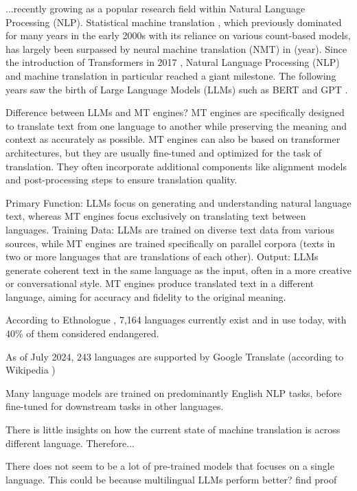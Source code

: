 \documentclass[a4paper]{article}
\begin{document}
...recently growing as a popular research field within Natural Language Processing (NLP). Statistical machine translation \cite{lopez-2008-smt}, which previously dominated for many years in the early 2000s with its reliance on various count-based models, has largely been surpassed by neural machine translation (NMT) in (year). Since the introduction of Transformers in 2017 \cite{vaswani-2017-attention}, Natural Language Processing (NLP) and machine translation in particular reached a giant milestone. The following years saw the birth of Large Language Models (LLMs) such as BERT \cite{devlin-2019-bert} and GPT \cite{openai-2024-gpt4}.

Difference between LLMs and MT engines?
MT engines are specifically designed to translate text from one language to another while preserving the meaning and context as accurately as possible. MT engines can also be based on transformer architectures, but they are usually fine-tuned and optimized for the task of translation. They often incorporate additional components like alignment models and post-processing steps to ensure translation quality.

Primary Function: LLMs focus on generating and understanding natural language text, whereas MT engines focus exclusively on translating text between languages.
Training Data: LLMs are trained on diverse text data from various sources, while MT engines are trained specifically on parallel corpora (texts in two or more languages that are translations of each other).
Output: LLMs generate coherent text in the same language as the input, often in a more creative or conversational style. MT engines produce translated text in a different language, aiming for accuracy and fidelity to the original meaning.

According to Ethnologue \cite{ethnologue-2024}, 7,164 languages currently exist and in use today, with 40\% of them considered endangered.

As of July 2024, 243 languages are supported by Google Translate (according to Wikipedia \cite{wikipedia-google-translate})

Many language models are trained on predominantly English NLP tasks, before fine-tuned for downstream tasks in other languages.

There is little insights on how the current state of machine translation is across different language. Therefore...

There does not seem to be a lot of pre-trained models that focuses on a single language. This could be because multilingual LLMs perform better? find proof
\end{document}
